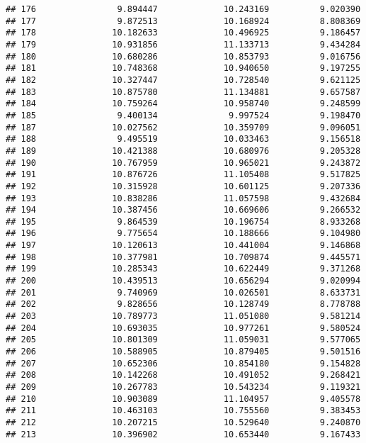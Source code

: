 \documentclass[
]{article}
\begin{document}
\begin{verbatim}
## 176                9.894447             10.243169          9.020390
## 177                9.872513             10.168924          8.808369
## 178               10.182633             10.496925          9.186457
## 179               10.931856             11.133713          9.434284
## 180               10.680286             10.853793          9.016756
## 181               10.748368             10.940650          9.197255
## 182               10.327447             10.728540          9.621125
## 183               10.875780             11.134881          9.657587
## 184               10.759264             10.958740          9.248599
## 185                9.400134              9.997524          9.198470
## 187               10.027562             10.359709          9.096051
## 188                9.495519             10.033463          9.156518
## 189               10.421388             10.680976          9.205328
## 190               10.767959             10.965021          9.243872
## 191               10.876726             11.105408          9.517825
## 192               10.315928             10.601125          9.207336
## 193               10.838286             11.057598          9.432684
## 194               10.387456             10.669606          9.266532
## 195                9.864539             10.196754          8.933268
## 196                9.775654             10.188666          9.104980
## 197               10.120613             10.441004          9.146868
## 198               10.377981             10.709874          9.445571
## 199               10.285343             10.622449          9.371268
## 200               10.439513             10.656294          9.020994
## 201                9.740969             10.026501          8.633731
## 202                9.828656             10.128749          8.778788
## 203               10.789773             11.051080          9.581214
## 204               10.693035             10.977261          9.580524
## 205               10.801309             11.059031          9.577065
## 206               10.588905             10.879405          9.501516
## 207               10.652306             10.854180          9.154828
## 208               10.142268             10.491052          9.268421
## 209               10.267783             10.543234          9.119321
## 210               10.903089             11.104957          9.405578
## 211               10.463103             10.755560          9.383453
## 212               10.207215             10.529640          9.240870
## 213               10.396902             10.653440          9.167433

\end{verbatim}
\end{document}
